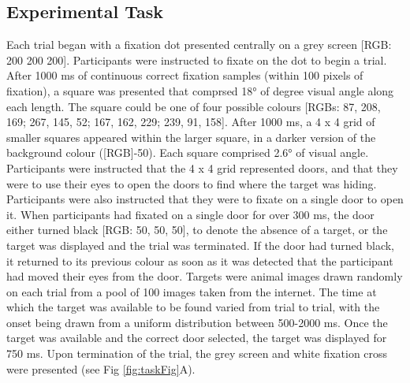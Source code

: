 \documentclass{article}
\begin{document}
\hypertarget{experimental-task}{%
\subsection{Experimental Task}\label{experimental-task}}

Each trial began with a fixation dot presented centrally on a grey
screen {[}RGB: 200 200 200{]}. Participants were instructed to fixate on
the dot to begin a trial. After 1000 ms of continuous correct fixation
samples (within 100 pixels of fixation), a square was presented that
comprsed 18° of degree visual angle along each length. The square could
be one of four possible colours {[}RGBs: 87, 208, 169; 267, 145, 52;
167, 162, 229; 239, 91, 158{]}. After 1000 ms, a 4 x 4 grid of smaller
squares appeared within the larger square, in a darker version of the
background colour ({[}RGB{]}-50). Each square comprised 2.6° of visual
angle. Participants were instructed that the 4 x 4 grid represented
doors, and that they were to use their eyes to open the doors to find
where the target was hiding. Participants were also instructed that they
were to fixate on a single door to open it. When participants had
fixated on a single door for over 300 ms, the door either turned black
{[}RGB: 50, 50, 50{]}, to denote the absence of a target, or the target
was displayed and the trial was terminated. If the door had turned
black, it returned to its previous colour as soon as it was detected
that the participant had moved their eyes from the door. Targets were
animal images drawn randomly on each trial from a pool of 100 images
taken from the internet. The time at which the target was available to
be found varied from trial to trial, with the onset being drawn from a
uniform distribution between 500-2000 ms. Once the target was available
and the correct door selected, the target was displayed for 750 ms. Upon
termination of the trial, the grey screen and white fixation cross were
presented (see Fig \ref{fig:taskFig}A).
\end{document}
